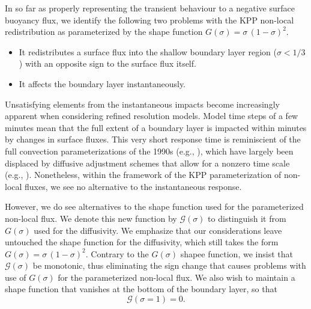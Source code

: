 In so far as properly representing the transient behaviour to a
negative surface buoyancy flux, we identify the following two problems
with the KPP non-local redistribution as parameterized by the
shape function $G(\sigma) = \sigma \, (1-\sigma)^{2}$.

\begin{itemize}

\item It redistributes a surface flux into the shallow boundary layer
  region ($\sigma < 1/3$) with an opposite sign to the surface flux
  itself.

\item It affects the boundary layer instantaneously. 

\end{itemize}
Unsatisfying elements from the instantaneous impacts become
increasingly apparent when considering refined resolution models.
Model time steps of a few minutes mean that the full extent of a
boundary layer is impacted within minutes by changes in surface
fluxes.  This very short response time is reminiscient of the full
convection parameterizations of the 1990s (e.g.,
\cite{Rahmstorf1993}), which have largely been displaced by diffusive
adjustment schemes that allow for a nonzero time scale (e.g.,
\cite{KlingerConvection}).  Nonetheless, within the framework of the
KPP parameterization of non-local fluxes, we see no alternative to the
instantaneous response.

However, we do see alternatives to the shape function used for the
parameterized non-local flux.  We denote this new function by
$\mathcal{G}(\sigma)$ to distinguish it from $G(\sigma)$ used for the
diffusivity.  We emphasize that our considerations leave untouched the
shape function for the diffusivity, which still takes the form
$G(\sigma) = \sigma \, (1-\sigma)^{2}$.  Contrary to the $G(\sigma)$
shapee function, we insist that $\mathcal{G}(\sigma)$ be monotonic,
thus eliminating the sign change that causes problems with use of
$G(\sigma)$ for the parameterized non-local flux.  We also wish to
maintain a shape function that vanishes at the bottom of the boundary
layer, so that
\begin{equation}
  \mathcal{G}(\sigma = 1)   = 0.
\end{equation}


